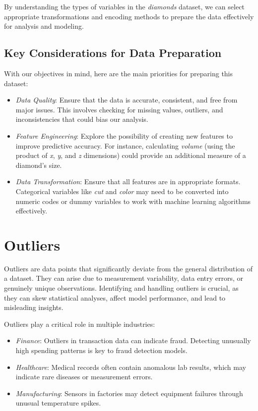 \documentclass[
]{book}
\providecommand{\tightlist}{%
  \setlength{\itemsep}{0pt}\setlength{\parskip}{0pt}}
\theoremstyle{definition}
\theoremstyle{definition}
\theoremstyle{definition}
\theoremstyle{definition}
\theoremstyle{remark}
\begin{document}
By understanding the types of variables in the \emph{diamonds} dataset, we can select appropriate transformations and encoding methods to prepare the data effectively for analysis and modeling.

\subsection*{Key Considerations for Data Preparation}\label{key-considerations-for-data-preparation}

With our objectives in mind, here are the main priorities for preparing this dataset:

\begin{itemize}
\tightlist
\item
  \emph{Data Quality}: Ensure that the data is accurate, consistent, and free from major issues. This involves checking for missing values, outliers, and inconsistencies that could bias our analysis.
\item
  \emph{Feature Engineering}: Explore the possibility of creating new features to improve predictive accuracy. For instance, calculating \emph{volume} (using the product of \emph{x}, \emph{y}, and \emph{z} dimensions) could provide an additional measure of a diamond's size.
\item
  \emph{Data Transformation}: Ensure that all features are in appropriate formats. Categorical variables like \emph{cut} and \emph{color} may need to be converted into numeric codes or dummy variables to work with machine learning algorithms effectively.
\end{itemize}

\section{Outliers}\label{Data-pre-outliers}

Outliers are data points that significantly deviate from the general distribution of a dataset. They can arise due to measurement variability, data entry errors, or genuinely unique observations. Identifying and handling outliers is crucial, as they can skew statistical analyses, affect model performance, and lead to misleading insights.

Outliers play a critical role in multiple industries:

\begin{itemize}
\tightlist
\item
  \emph{Finance}: Outliers in transaction data can indicate fraud. Detecting unusually high spending patterns is key to fraud detection models.
\item
  \emph{Healthcare}: Medical records often contain anomalous lab results, which may indicate rare diseases or measurement errors.
\item
  \emph{Manufacturing}: Sensors in factories may detect equipment failures through unusual temperature spikes.
\end{itemize}
\end{document}
